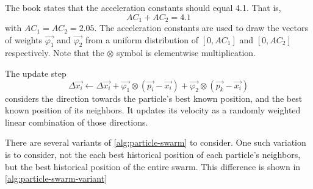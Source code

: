 \documentclass[12pt]{article}
\begin{document}
The book states that the acceleration constants should equal 4.1. That is,
\[AC_1 + AC_2 = 4.1\]
with $AC_1 = AC_2 = 2.05$. The acceleration constants are used to draw the vectors of
weights $\vec{\varphi_1}$ and $\vec{\varphi_2}$ from a uniform distribution of $[0, AC_1]$ and $[0,
            AC_2]$ respectively. Note that the $\otimes$ symbol is elementwise multiplication.

The update step
\[\Delta\vec{x_i} \gets \Delta\vec{x_i} + \vec{\varphi_1} \otimes (\vec{p_i} - \vec{x_i}) +
    \vec{\varphi_2} \otimes (\vec{p_k} - \vec{x_i})\]
considers the direction towards the particle's best known position, and the best known position of
its neighbors. It updates its velocity as a randomly weighted linear combination of those
directions.

There are several variants of \autoref{alg:particle-swarm} to consider. One such variation is to
consider, not the each best historical position of each particle's neighbors, but the best
historical position of the entire swarm. This difference is shown in
\autoref{alg:particle-swarm-variant}
\end{document}
